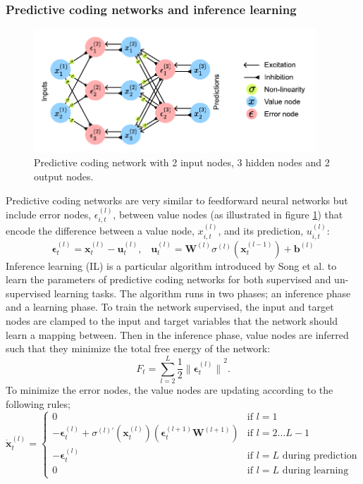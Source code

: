 \documentclass[a4paper,11pt]{article} %
\begin{document}
\subsubsection{Predictive coding networks and inference learning}
\begin{figure}
  \centering
  \includegraphics[width=300pt]{graphics/predictive-coding-network.pdf}
  \caption{Predictive coding network with 2 input nodes, 3 hidden nodes and 2 output nodes.}
  \label{fig:predictive-coding-network}
\end{figure}
Predictive coding networks are very similar to feedforward neural networks but include error nodes, $\epsilon_{i,t}^{(l)}$, between value nodes (as illustrated in figure \ref{fig:predictive-coding-network}) that encode the difference between a value node, $x_{i,t}^{(l)}$, and its prediction, $u_{i,t}^{(l)}$:
\begin{equation} \label{eq:pc-error-nodes-and-preds}
  \mathbf{\epsilon}_t^{(l)} = \mathbf{x}_t^{(l)} - \mathbf{u}_t^{(l)},\hspace{10pt}  \mathbf{u}_t^{(l)} = \mathbf{W}^{(l)} \sigma^{(l)}(\mathbf{x}_t^{(l-1)}) + \mathbf{b}^{(l)}
\end{equation}
 Inference learning (IL) is a particular algorithm introduced by Song et al. \cite{PredictiveCodingNetworks} to learn the parameters of predictive coding networks for both supervised and un-supervised learning tasks. The algorithm runs in two phases; an inference phase and a learning phase. To train the network supervised, the input and target nodes are clamped to the input and target variables that the network should learn a mapping between. Then in the inference phase, value nodes are inferred such that they minimize the total free energy of the network:
\begin{equation}
  F_t = \sum_{l=2}^{L}{
    \frac{1}{2}{\lVert \mathbf{\epsilon}_t^{(l)} \rVert}^2.
  }
\end{equation}
To minimize the error nodes, the value nodes are updating according to the following rules;
\begin{equation} \label{eq:update-value-nodes}
  \dot{\mathbf{x}}_t^{(l)} = \begin{cases}
    0 & \text{if } l=1 \\
     -\mathbf{\epsilon}_t^{(l)} + \sigma^{(l)\prime}(\mathbf{x}_t^{(l)}) ( \mathbf{\epsilon}_t^{(l+1)} \mathbf{W}^{(l+1)} )  & \text{if } l = 2 \ldots L-1 \\
    - \mathbf{\epsilon}_t^{(l)} & \text {if } l = L \text{ during prediction} \\
    0 & \text {if } l = L \text{ during learning}
  \end{cases}
\end{equation}
\end{document}
